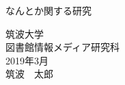\thispagestyle{empty}
\begin{center}
\fontsize{20pt}{40pt}\selectfont

なんとか関する研究

\vspace{15cm} %

筑波大学\\
\vspace{-0.3cm} %
図書館情報メディア研究科\\
\vspace{-0.3cm} %
2019年3月\\
\vspace{-0.3cm} %
筑波　太郎
\end{center}
